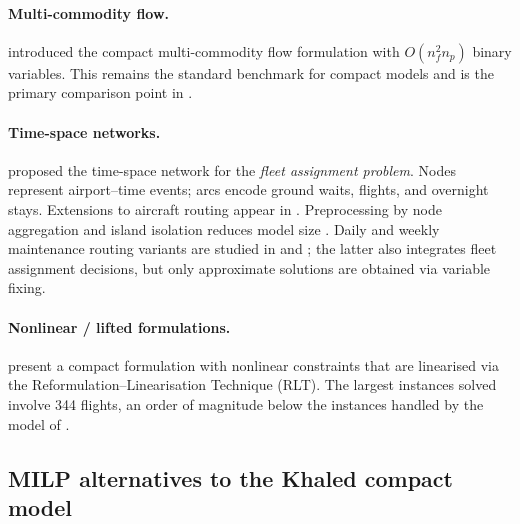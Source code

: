 \paragraph{Multi-commodity flow.}
\citet{levin1971scheduling} introduced the compact multi-commodity flow
formulation with $O(n_f^2 n_p)$ binary variables.  This remains the standard
benchmark for compact models and is the primary comparison point in
\citet{khaled2018compact}.

\paragraph{Time-space networks.}
\citet{hane1995fleet} proposed the time-space network for the \emph{fleet
assignment problem}.  Nodes represent airport--time events; arcs encode
ground waits, flights, and overnight stays.  Extensions to aircraft routing
appear in \citet{clarke1996maintenance}.  Preprocessing by node aggregation
and island isolation reduces model size
\citep{hane1995fleet, sherali2006airline}.  Daily and weekly maintenance
routing variants are studied in \citet{liang2011new} and
\citet{liang2012network}; the latter also integrates fleet assignment
decisions, but only approximate solutions are obtained via variable fixing.

\paragraph{Nonlinear / lifted formulations.}
\citet{haouari2012lifted} present a compact formulation with nonlinear
constraints that are linearised via the Reformulation--Linearisation Technique
(RLT).  The largest instances solved involve 344 flights, an order of magnitude
below the instances handled by the model of \citet{khaled2018compact}.

\subsection{MILP alternatives to the Khaled compact model}

